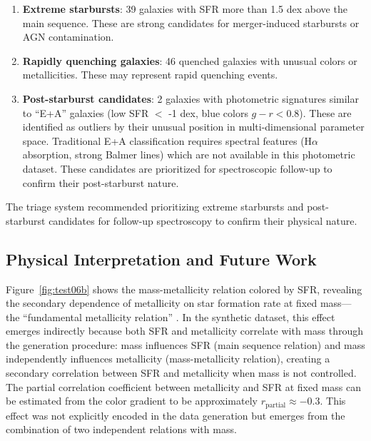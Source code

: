\documentclass[usenatbib]{rasti}
\begin{document}
\begin{enumerate}
\item \textbf{Extreme starbursts}: 39 galaxies with SFR more than 1.5 dex above the main sequence. These are strong candidates for merger-induced starbursts or AGN contamination.
\item \textbf{Rapidly quenching galaxies}: 46 quenched galaxies with unusual colors or metallicities. These may represent rapid quenching events.
\item \textbf{Post-starburst candidates}: 2 galaxies with photometric signatures similar to ``E+A'' galaxies (low SFR $<$ -1 dex, blue colors $g-r < 0.8$). These are identified as outliers by their unusual position in multi-dimensional parameter space. Traditional E+A classification requires spectral features (H$\alpha$ absorption, strong Balmer lines) which are not available in this photometric dataset. These candidates are prioritized for spectroscopic follow-up to confirm their post-starburst nature.
\end{enumerate}

The triage system recommended prioritizing extreme starbursts and post-starburst candidates for follow-up spectroscopy to confirm their physical nature.

\subsection{Physical Interpretation and Future Work}

Figure~\ref{fig:test06b} shows the mass-metallicity relation colored by SFR, revealing the secondary dependence of metallicity on star formation rate at fixed mass---the ``fundamental metallicity relation'' \cite{mannucci2010}. In the synthetic dataset, this effect emerges indirectly because both SFR and metallicity correlate with mass through the generation procedure: mass influences SFR (main sequence relation) and mass independently influences metallicity (mass-metallicity relation), creating a secondary correlation between SFR and metallicity when mass is not controlled. The partial correlation coefficient between metallicity and SFR at fixed mass can be estimated from the color gradient to be approximately $r_{\text{partial}} \approx -0.3$. This effect was not explicitly encoded in the data generation but emerges from the combination of two independent relations with mass.
\end{document}
